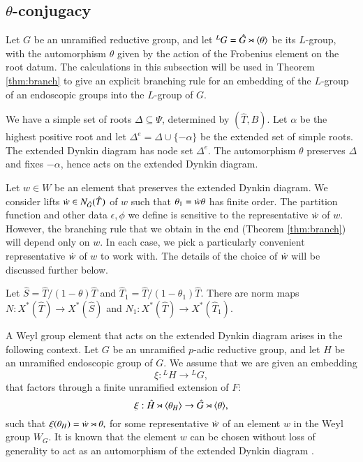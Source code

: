 \subsection{$\theta$-conjugacy}

Let $G$ be an unramified reductive group, and let ${}^LG = \hat G
\rtimes \langle{\theta}\rangle$ be its $L$-group, with the automorphism $\theta$
given by the action of the Frobenius element on the root datum.  
The calculations in this subsection will be used in Theorem
\ref{thm:branch} to give an explicit branching rule for an embedding of
the $L$-group of an endoscopic groups into the $L$-group of $G$.

We have a simple set of roots $\Delta\subseteq \Psi$, determined by $(\hat T,\hat
B)$.  Let $\alpha$ be the highest positive root and let $\Delta^e =
\Delta \cup \{-\alpha\}$ be the extended set of simple roots.  The
extended Dynkin diagram has node set $\Delta^e$.  The automorphism
$\theta$ preserves $\Delta$ and fixes $-\alpha$, hence acts on the
extended Dynkin diagram.

Let $w\in W$ be an element that preserves the extended Dynkin diagram.
We consider lifts $\dot w\in N_{\hat G}(\hat T)$ of $w$ such that
$\theta_1 = \dot w \theta$ has finite order.  The partition function
and other data $\epsilon,\phi$ we define is sensitive to the
representative $\dot w$ of $w$.  However, the branching rule that we
obtain in the end (Theorem \ref{thm:branch}) will depend only on $w$.
In each case, we pick a particularly convenient representative $\dot w$
of $w$ to work with.  The details of the choice of $\dot w$ will be
discussed further below.

Let $\hat S = \hat T/(1-\theta)\hat T$ and $\hat T_1 = \hat
T/(1-\theta_1)\hat T$.  There are norm maps $N:X^*(\hat T)\to X^*(\hat
S)$ and $N_1:X^*(\hat T)\to X^*(\hat T_1)$.

A Weyl group element that acts on the extended Dynkin diagram arises
in the following context.  Let $G$ be an unramified $p$-adic reductive
group, and let $H$ be an unramified endoscopic group of $G$.  We
assume that we are given an embedding
\[
\xi:{}^LH\to {}^LG,
\]
that factors through a finite unramified extension of $F$:
\[
\xi:\hat H\rtimes \langle{\theta_H}\rangle\to \hat G\rtimes \langle{\theta}\rangle,
\]
such that $\xi(\theta_H) = \dot w \rtimes \theta,$ for some
representative $\dot w $ of an element $w$ in the Weyl group $W_G$.  It
is known that the element $w$ can be chosen without loss of generality
to act as an automorphism of the extended Dynkin diagram
\cite[\S4.7]{hales1993simple}.

